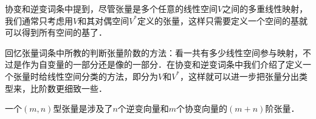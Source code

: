 
\begin{issues}
\issueDraft
\end{issues}


协变和逆变词条中提到，尽管张量是多个任意的线性空间$V$之间的多重线性映射，我们通常只考虑用$V$和其对偶空间$V^*$定义的张量，这样只需要定义一个空间的基就可以得到所有空间的基了．

回忆张量词条中所教的判断张量阶数的方法：看一共有多少线性空间参与映射，不过是作为自变量的一部分还是像的一部分．在协变和逆变词条中我们介绍了定义一个张量时给线性空间分类的方法，即分为$V$和$V^*$，这样就可以进一步把张量分出类型来，比阶数更细致一些．

\begin{definition}{}
一个$(m, n)$型张量是涉及了$n$个逆变向量和$m$个协变向量的$(m+n)$阶张量．
\end{definition}
